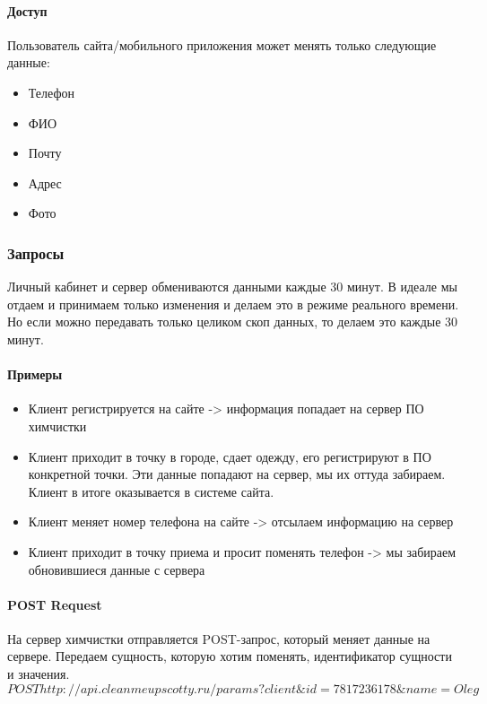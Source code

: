 \documentclass[DIV=calc, paper=a4, fontsize=11pt]{scrartcl} %
\begin{document}
\paragraph{Доступ}
Пользователь сайта/мобильного приложения может менять только следующие данные:

\begin{itemize}
	\item Телефон
	\item ФИО
	\item Почту
	\item Адрес
	\item Фото
\end{itemize}

\subsubsection{Запросы}
Личный кабинет и сервер обмениваются данными каждые 30 минут. В идеале мы отдаем и принимаем только изменения и делаем это в режиме реального времени. Но если можно передавать только целиком скоп данных, то делаем это каждые 30 минут.
\paragraph{Примеры}
\begin{itemize}
	\item Клиент регистрируется на сайте -> информация попадает на сервер ПО химчистки
	\item Клиент приходит в точку в городе, сдает одежду, его регистрируют в ПО конкретной точки. Эти данные попадают на сервер, мы их оттуда забираем. Клиент в итоге оказывается в системе сайта.
	\item Клиент меняет номер телефона на сайте -> отсылаем информацию на сервер
	\item Клиент приходит в точку приема и просит поменять телефон -> мы забираем обновившиеся данные с сервера
\end{itemize}


\paragraph{POST Request}
На сервер химчистки отправляется POST-запрос, который меняет данные на сервере. Передаем сущность, которую хотим поменять, идентификатор сущности и значения.
\begin{displaymath}
	POST http://api.cleanmeupscotty.ru/params?client\&id=7817236178\&name=Oleg
\end{displaymath}	
\end{document}

